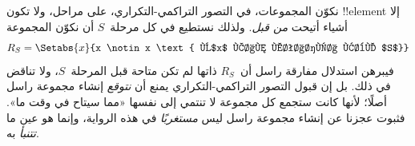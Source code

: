 \documentclass[../../../include/open-logic-section]{subfiles}
\begin{document}
نكوّن المجموعات، في التصور التراكمي-التكراري، على مراحل، ولا تكون
!!{element} إلا أشياء أتيحت \emph{من قبل}. ولذلك نستطيع في كل
مرحلة~$S$ أن نكوّن المجموعة
\[
	R_S = \Setabs{x}{x \notin x \text{ و$x$ كان متاحًا قبل $S$}}
\]
فيبرهن استدلال مفارقة راسل أن~$R_S$ ذاتها لم تكن متاحة قبل
المرحلة~$S$، ولا تناقض في ذلك. بل إن قبول التصور التراكمي-التكراري يمنع
أن \emph{نتوقع} إنشاء مجموعة راسل أصلًا؛ لأنها كانت ستجمع كل مجموعة لا
تنتمي إلى نفسها «مما سيتاح في وقت ما». فثبوت عجزنا عن إنشاء مجموعة راسل
ليس \emph{مستغربًا} في هذه الرواية، وإنما هو عين ما \emph{تتنبأ} به.

%

\end{document}
